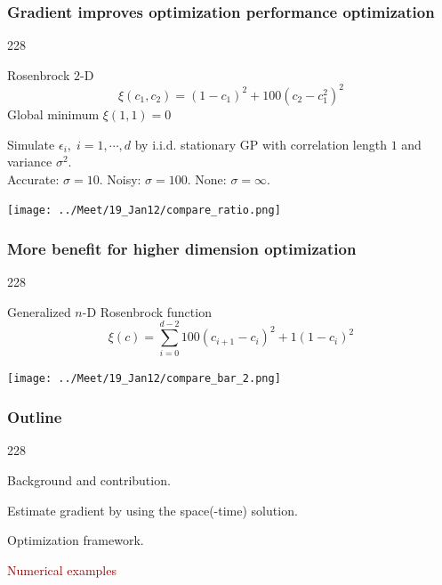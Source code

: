\documentclass{beamer}
\newcommand{\barrow}{\item[\color{darkred}\ding{228}]}
\begin{document}
\begin{frame}
    \frametitle{Gradient improves optimization performance \hfill \scriptsize{optimization}}\small
    \begin{dinglist}{228}
    \barrow Rosenbrock $2$-D
    $$
        \xi(c_1,c_2) = (1-c_1)^2 + 100(c_2-c_1^2)^2
    $$
    Global minimum $\xi(1, 1) = 0$
        \barrow Simulate $\epsilon_i,\; i=1,\cdots, d$ by i.i.d. stationary GP with correlation length
        $1$ and variance $\sigma^2$.\\
            Accurate: $\sigma=10$.
            Noisy: $\sigma=100$.
            None: $\sigma=\infty$.
     \end{dinglist}
       \begin{center}
           \texttt{[image: ../Meet/19\_Jan12/compare\_ratio.png]}
       \end{center}
\end{frame}

\begin{frame}
   \frametitle{More benefit for higher dimension \hfill \scriptsize{optimization}}\small
   \begin{dinglist}{228}
      \barrow
      Generalized $n$-D Rosenbrock function
      $$
          \xi(c) = \sum_{i=0}^{d-2} 100(c_{i+1}-c_i)^2 + 1(1-c_i)^2 
      $$
   \end{dinglist}
   \begin{center}
       \texttt{[image: ../Meet/19\_Jan12/compare\_bar\_2.png]}
   \end{center}
\end{frame}


\setcounter{framenumber}{41}
\begin{frame}
    \frametitle{Outline}\small
    \begin{dinglist}{228}
        \barrow {}Background and contribution.
        \barrow Estimate gradient by using the space(-time) solution.
        \barrow Optimization framework.
        \barrow \textcolor{darkred}{Numerical examples}
    \end{dinglist}
\end{frame}
\end{document}

